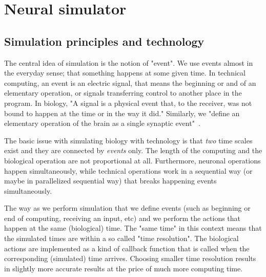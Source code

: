 
\iflatexml
\else
\minitoc
\fi
\chapter[Simulation]{Neural simulator\label{ch:Simulation}}
	
	

	
\section{\label{SIMULATION_MAIN_PAGE} Simulation principles and technology}
%
%

The central idea of simulation is the notion of "event".
We use events almost in the everyday sense; that something happens at some given time.
In technical computing, an event is an electric signal, that means
the beginning or and of an elementary operation, or signals transferring
control to another place in the program.
In biology,  "A signal is a physical event that, to the receiver,
was not bound to happen at the time or in the way it did." \cite{ mackay1952limiting}
Similarly, we "define an elementary operation of the brain as a single synaptic event"~\cite{ComputerBrainSejnowski:1989}.


The basic issue with simulating biology with technology is that
\textit{two} time scales exist and they are connected by \textit{events} only.
The length of the computing and the biological operation are
not proportional at all. Furthermore, neuronal operations happen
simultaneously, while technical operations work in a sequential way
(or maybe in parallelized sequential way) that breaks happening events simultaneously.

The way as we perform simulation that we define events
(such as beginning or end of computing, receiving an input, etc)
and we perform the actions that happen at the same (biological) time.
The "same time" in this context means that the simulated times
are within a so called "time resolution". The biological actions
are implemented as a kind of callback function that is called when
the corresponding (simulated) time arrives. Choosing smaller time resolution
results in slightly more accurate results at the price of much more computing time.

